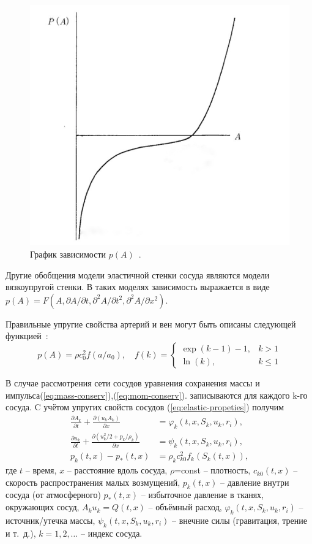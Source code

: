 \begin{figure}[h]
\centering
\includegraphics[width=0.3\linewidth]{IMG_20230309_021324_943-01.jpeg}
\caption{ График зависимости $p(A)$~\cite{pedly:1998}.}
\label{fig:mpr}
\end{figure}
Другие обобщения модели эластичной стенки сосуда являются модели вязкоупругой стенки. В таких моделях зависимость выражается в виде
$
p(A)=F(A,\partial {A} / \partial {t},\partial^2{A} / \partial {t^2},\partial^2{A} / \partial {x^2})
$.


Правильные упругие свойства артерий и вен могут быть описаны следующей функцией~\cite{holodov:2001}:
\begin{equation}
    \label{eq:elastic-propeties}
    p(A)=\rho c^2_0 f(a/a_0), 
    \quad
    f(k)=\begin{cases}
    \exp(k-1)-1, &k>1 \\ \ln(k), &k \leq 1
    \end{cases}
\end{equation}

В случае рассмотрения сети сосудов уравнения сохранения массы и импульса(\ref{eq:mass-conserv}),(\ref{eq:mom-conserv}). 
записываются для каждого k-го сосуда. C учётом упругих свойств сосудов (\ref{eq:elastic-propeties}) получим  
\begin{align}
    \label{eq:mass-conserv}
    \frac{\partial A_k}{ \partial t} + \frac{\partial(u_kA_k)}{\partial x}&=\varphi _k(t,x,S_k,u_k,r_i),\\
    \label{eq:mom-conserv}
    \frac{\partial u_k}{\partial t} + \frac{\partial(u_k^2/2+p_k/\rho_k)}{\partial x}&= \psi_k(t,x,S_k,u_k,r_i),\\
    \label{eq:t-pressure}
    p_k(t,x)-p_*(t,x)&=\rho_k c^2_{k0}f_k(S_k(t,x)),
\end{align}
где $t$ -- время, $x$ -- расстояние вдоль сосуда, $\rho$=const -- плотность, $c_{k0}(t,x)$ -- скорость распространения малых возмущений,
  $p_k(t,x)$ -- давление внутри сосуда (от атмосферного) $p_*(t,x)$ -- избыточное давление в тканях, окружающих сосуд, 
  $A_ku_k=Q(t,x)$ -- объёмный расход, $\varphi_k(t,x,S_k,u_k,r_i)$ -- источник/утечка массы, $\psi_k(t,x,S_k,u_k,r_i)$ -- внечние силы (гравитация, трение и т.~д.),
  $k=1,2,\ldots$ -- индекс сосуда.
\\ 

